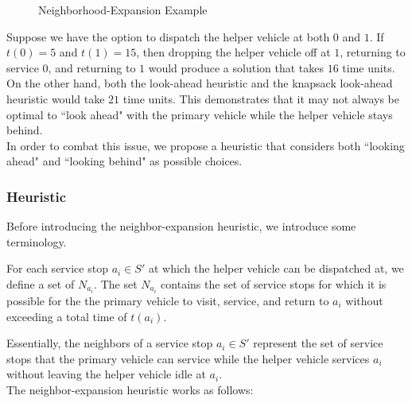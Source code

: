 \documentclass[12pt]{scrartcl}
\begin{document}
\begin{figure}[H]
  \centering
  \caption{Neighborhood-Expansion Example}
\end{figure}

Suppose we have the option to dispatch the helper vehicle at both $0$ and $1$. If $t(0) = 5$ and $t(1) = 15$, then dropping the helper vehicle off at $1$, returning to service $0$, and returning to $1$ would produce a solution that takes $16$ time units. On the other hand, both the look-ahead heuristic and the knapsack look-ahead heuristic would take $21$ time units. This demonstrates that it may not always be optimal to ``look ahead" with the primary vehicle while the helper vehicle stays behind. \\

In order to combat this issue, we propose a heuristic that considers both ``looking ahead" and ``looking behind" as possible choices. 

\subsubsection{Heuristic}
Before introducing the neighbor-expansion heuristic, we introduce some terminology.

\begin{definition}
For each service stop $a_i \in S'$ at which the helper vehicle can be dispatched at, we define a set of  $N_{a_{i}}$. The set $N_{a_{i}}$ contains the set of service stops for which it is possible for the the primary vehicle to visit, service, and return to $a_i$ without exceeding a total time of $t(a_i)$.  
\end{definition}

Essentially, the neighbors of a service stop $a_i \in S'$ represent the set of service stops that the primary vehicle can service while the helper vehicle services $a_i$ without leaving the helper vehicle idle at $a_i$. \\

The neighbor-expansion heuristic works as follows:
\end{document}
